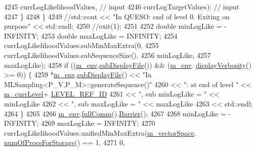 \begin{DoxyCode}
{4245                    currLogLikelihoodValues, \textcolor{comment}{// input}
4246                    currLogTargetValues);    \textcolor{comment}{// input}
4247     \}
4248   \}
4249   \textcolor{comment}{//std::cout << "In QUESO: end of level 0. Exiting on purpose" << std::endl;}
4250   \textcolor{comment}{//exit(1);}
4251 
4252   \textcolor{keywordtype}{double} minLogLike = -INFINITY;
4253   \textcolor{keywordtype}{double} maxLogLike =  INFINITY;
4254   currLogLikelihoodValues.subMinMaxExtra(0,
4255                                          currLogLikelihoodValues.subSequenceSize(),
4256                                          minLogLike,
4257                                          maxLogLike);
4258   \textcolor{keywordflow}{if} ((\hyperlink{class_q_u_e_s_o_1_1_m_l_sampling_a13f1ca4fe9f94822fe572a743eaced1d}{m\_env}.\hyperlink{class_q_u_e_s_o_1_1_base_environment_a8a0064746ae8dddfece4229b9ad374d6}{subDisplayFile}()) && (\hyperlink{class_q_u_e_s_o_1_1_m_l_sampling_a13f1ca4fe9f94822fe572a743eaced1d}{m\_env}.
      \hyperlink{class_q_u_e_s_o_1_1_base_environment_a1fe5f244fc0316a0ab3e37463f108b96}{displayVerbosity}() >= 0)) \{
4259     *\hyperlink{class_q_u_e_s_o_1_1_m_l_sampling_a13f1ca4fe9f94822fe572a743eaced1d}{m\_env}.\hyperlink{class_q_u_e_s_o_1_1_base_environment_a8a0064746ae8dddfece4229b9ad374d6}{subDisplayFile}() << \textcolor{stringliteral}{"In MLSampling<P\_V,P\_M>::generateSequence()"}
4260                             << \textcolor{stringliteral}{": at end of level "}  << \hyperlink{class_q_u_e_s_o_1_1_m_l_sampling_af9416874c856e50f3b35270e801f17e4}{m\_currLevel}+
      \hyperlink{_m_l_sampling_level_options_8h_a68d15eaf394d210effcf584b938206d3}{LEVEL\_REF\_ID}
4261                             << \textcolor{stringliteral}{", sub minLogLike = "} << minLogLike
4262                             << \textcolor{stringliteral}{", sub maxLogLike = "} << maxLogLike
4263                             << std::endl;
4264   \}
4265 
4266   \hyperlink{class_q_u_e_s_o_1_1_m_l_sampling_a13f1ca4fe9f94822fe572a743eaced1d}{m\_env}.\hyperlink{class_q_u_e_s_o_1_1_base_environment_a0b0779b41ff304058856e97e1d16b4d4}{fullComm}().\hyperlink{class_q_u_e_s_o_1_1_mpi_comm_a4059971c30e023b272fccaa6aa00c426}{Barrier}();
4267 
4268   minLogLike = -INFINITY;
4269   maxLogLike =  INFINITY;
4270   currLogLikelihoodValues.unifiedMinMaxExtra(\hyperlink{class_q_u_e_s_o_1_1_m_l_sampling_a7bc4c72f65ba9166ed94a6e198b0915b}{m\_vectorSpace}.
      \hyperlink{class_q_u_e_s_o_1_1_vector_space_a67b0c3620662116f5a346fdaa5faf38e}{numOfProcsForStorage}() == 1,
4271                                              0,
}
\end{DoxyCode}
